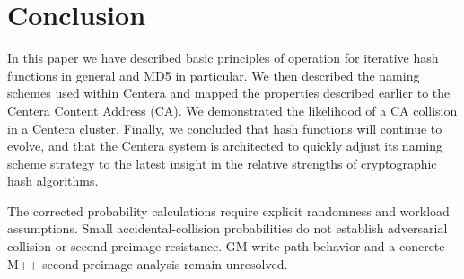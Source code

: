 \section{Conclusion}\label{sec:6}

In this paper we have described basic principles of operation for
iterative hash functions in general and MD5 in particular. We then
described the naming schemes used within Centera and mapped the
properties described earlier to the Centera Content Address (CA). We
demonstrated the likelihood of a CA collision in a Centera cluster.
Finally, we concluded that hash functions will continue to evolve, and
that the Centera system is architected to quickly adjust its naming
scheme strategy to the latest insight in the relative strengths of
cryptographic hash algorithms.

The corrected probability calculations require explicit randomness and workload
assumptions. Small accidental-collision probabilities do not establish
adversarial collision or second-preimage resistance. GM write-path behavior
and a concrete M++ second-preimage analysis remain unresolved.
